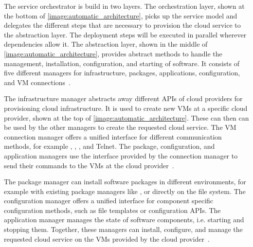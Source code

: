 The service orchestrator is build in two layers.
The orchestration layer, shown at the bottom of \autoref{image:automatic_architecture}, picks up the service model and delegates the different steps that are necessary to provision the cloud service to the abstraction layer.
The deployment steps will be executed in parallel wherever dependencies allow it.
The abstraction layer, shown in the middle of \autoref{image:automatic_architecture}, provides abstract methods to handle the management, installation, configuration, and starting of software.
It consists of five different managers for infrastructure, packages, applications, configuration, and VM connections~\autocite{provisioning:architecture}.

The infrastructure manager abstracts away different APIs of cloud providers for provisioning cloud infrastructure.
It is used to create new VMs at a specific cloud provider, shown at the top of \autoref{image:automatic_architecture}.
These can then can be used by the other managers to create the requested cloud service.
The VM connection manager offers a unified interface for different communication methods, for example , , , and Telnet.
The package, configuration, and application managers use the interface provided by the connection manager to send their commands to the VMs at the cloud provider~\autocite{provisioning:architecture}.

The package manager can install software packages in different environments, for example with existing package managers like , or directly on the file system.
The configuration manager offers a unified interface for component specific configuration methods, such as file templates or configuration APIs.
The application manager manages the state of software components, i.e. starting and stopping them.
Together, these managers can install, configure, and manage the requested cloud service on the VMs provided by the cloud provider~\autocite{provisioning:architecture}.
